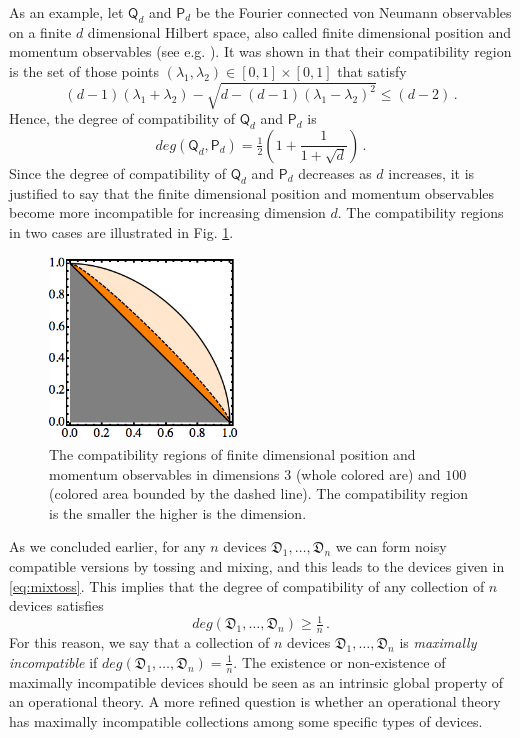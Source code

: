 \documentclass[12pt]{iopart}
\theoremstyle{definition}
\newcommand{\half}{\tfrac{1}{2}} %
\newcommand{\Po}{\mathsf{P}}%
\newcommand{\Qo}{\mathsf{Q}}%
\newcommand{\Dev}{\mathfrak{D}} %
\begin{document}
As an example, let $\Qo_d$ and $\Po_d$ be the Fourier connected von Neumann observables on a finite $d$ dimensional Hilbert space, also called  finite dimensional position and momentum observables (see e.g. \cite{Vourdas97}).
It was shown in \cite{CaHeTo12} that their compatibility region is the set of those points $(\lambda_1,\lambda_2)\in [0,1]\times[0,1]$ that satisfy
\begin{equation}\label{eq:lambda}
(d-1) (\lambda_1 + \lambda_2) -  \sqrt{d  - (d-1) (\lambda_1 - \lambda_2)^2}\leq (d-2) \, .
\end{equation}
Hence, the degree of compatibility of $\Qo_d$ and $\Po_d$ is
\begin{equation}\label{eq:pos-mom}
deg(\Qo_d,\Po_d) = \half \left( 1 + \frac{1}{1+\sqrt{d}} \right) \, .
\end{equation}
Since the degree of compatibility of $\Qo_d$ and $\Po_d$ decreases as $d$ increases, it is justified to say that the finite dimensional position and momentum observables become more incompatible for increasing dimension $d$.
The compatibility regions in two cases are illustrated in Fig. \ref{fig:dim}.

\begin{figure}\begin{center}
\includegraphics[width=5cm]{fig_regiondim.png}
\caption{The compatibility regions of finite dimensional position and momentum observables in dimensions $3$ (whole colored are) and $100$ (colored area bounded by the dashed line).
The compatibility region is the smaller the higher is the dimension.}
\label{fig:dim}
\end{center}
\end{figure}
 
As we concluded earlier, for any $n$ devices $\Dev_1,\ldots,\Dev_n$ we can form noisy compatible versions by tossing and mixing, and this leads to the devices given in \eqref{eq:mixtoss}.
This implies that the degree of compatibility of any collection of $n$ devices satisfies 
\begin{equation}
deg(\Dev_1,\ldots,\Dev_n) \geq \tfrac{1}{n} \, .
\end{equation}
For this reason, we say that a collection of $n$ devices $\Dev_1,\ldots,\Dev_n$ is \emph{maximally incompatible} if $deg(\Dev_1,\ldots,\Dev_n) = \tfrac{1}{n}$. 
The existence or non-existence of maximally incompatible devices should be seen as an intrinsic global property of an operational theory. 
A more refined question is whether an operational theory has maximally incompatible collections among some specific types of devices. 
\end{document}
